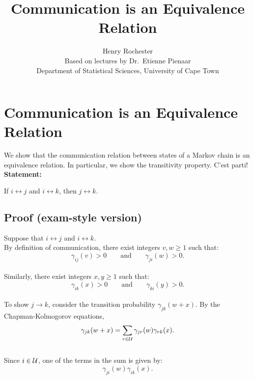 \documentclass[12pt]{article}
\begin{document}
\title{Communication is an Equivalence Relation}
\author{Henry Rochester\\
\small Based on lectures by Dr.\ Etienne Pienaar\\
\small Department of Statistical Sciences, University of Cape Town}
\date{}
\maketitle

\section*{Communication is an Equivalence Relation}

We show that the communication relation between states of a Markov chain is an equivalence relation. In particular, we show the transitivity property. C'est parti!\\

\textbf{Statement:}

If $i \leftrightarrow j$ and $i \leftrightarrow k$, then $j \leftrightarrow k$.

\vspace{0.5cm}

\subsection*{Proof (exam-style version)}

Suppose that $i \leftrightarrow j$ and $i \leftrightarrow k$.\\

By definition of communication, there exist integers $v,w \geq 1$ such that:\\
\[
\gamma_{ij}(v) > 0
\qquad \text{and} \qquad
\gamma_{ji}(w) > 0.
\]\\

Similarly, there exist integers $x,y \geq 1$ such that:\\
\[
\gamma_{ik}(x) > 0
\qquad \text{and} \qquad
\gamma_{ki}(y) > 0.
\]\\

To show $j \to k$, consider the transition probability $\gamma_{jk}(w+x)$. By the Chapman-Kolmogorov equations,\\
\[
\gamma_{jk}(w+x)
=
\sum_{r \in \cal{U}} \gamma_{jr}(w)\gamma_{rk}(x).
\]\\

Since $i \in \cal{U}$, one of the terms in the sum is given by: \\
\[
\gamma_{ji}(w)\gamma_{ik}(x).
\]\\
\end{document}
